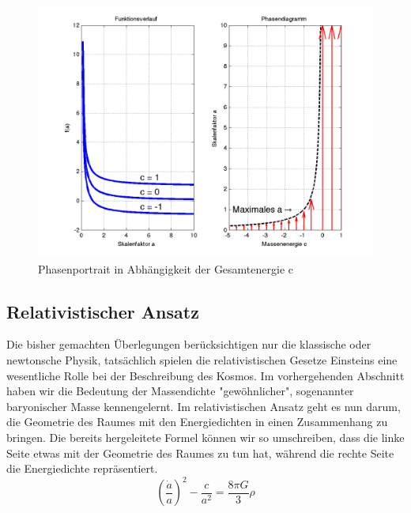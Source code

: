 \begin{refsection}
\begin{enumerate}
\end{enumerate}

\begin{figure}[h]
	\centering
	\includegraphics[width  = \textwidth]{friedmann/images/phasendiagramm.png}
	\caption{Phasenportrait in Abhängigkeit der Gesamtenergie c
		\label{friedmann:phasenportrait}}
\end{figure}%

%
	
\subsection{Relativistischer Ansatz}
Die bisher gemachten Überlegungen berücksichtigen nur die klassische oder newtonsche Physik, tatsächlich spielen die relativistischen Gesetze Einsteins eine wesentliche Rolle bei der Beschreibung des Kosmos.
Im vorhergehenden Abschnitt haben wir die Bedeutung der Massendichte "gewöhnlicher", sogenannter baryonischer Masse kennengelernt. Im relativistischen Ansatz geht es nun darum, die Geometrie des Raumes mit den Energiedichten in einen Zusammenhang zu bringen.
Die bereits hergeleitete Formel können wir so umschreiben, dass die linke Seite etwas mit der Geometrie des Raumes zu tun hat, während die rechte Seite die Energiedichte repräsentiert.
\begin{equation}
\left(\frac{\dot{a}}{a} \right)^2 - \frac{c}{a^2} = \frac{8 \pi G}{3} \rho 
\label{friedmann:Einstein}
\end{equation}


\end{refsection}
